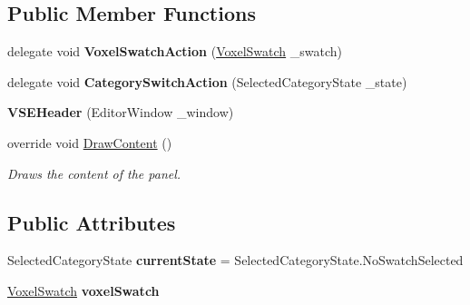\subsection*{Public Member Functions}
\begin{DoxyCompactItemize}
\item 
delegate void {\bfseries Voxel\+Swatch\+Action} (\hyperlink{class_voxel_swatch}{Voxel\+Swatch} \+\_\+swatch)\hypertarget{class_v_s_e_header_a7181bf17ebc70c90620ca9e4e7a679b5}{}\label{class_v_s_e_header_a7181bf17ebc70c90620ca9e4e7a679b5}

\item 
delegate void {\bfseries Category\+Switch\+Action} (Selected\+Category\+State \+\_\+state)\hypertarget{class_v_s_e_header_a701bc298aa2c2d6e552d33bfbd1cd495}{}\label{class_v_s_e_header_a701bc298aa2c2d6e552d33bfbd1cd495}

\item 
{\bfseries V\+S\+E\+Header} (Editor\+Window \+\_\+window)\hypertarget{class_v_s_e_header_ac43871f65cffd7378b7f92753f54d35d}{}\label{class_v_s_e_header_ac43871f65cffd7378b7f92753f54d35d}

\item 
override void \hyperlink{class_v_s_e_header_ac866415e77168e78f59965f3a61a0e64}{Draw\+Content} ()
\begin{DoxyCompactList}\small\item\em Draws the content of the panel. \end{DoxyCompactList}\end{DoxyCompactItemize}
\subsection*{Public Attributes}
\begin{DoxyCompactItemize}
\item 
Selected\+Category\+State {\bfseries current\+State} = Selected\+Category\+State.\+No\+Swatch\+Selected\hypertarget{class_v_s_e_header_ae6542a2ef5fba7ebd929bd8d0c9c7dac}{}\label{class_v_s_e_header_ae6542a2ef5fba7ebd929bd8d0c9c7dac}

\item 
\hyperlink{class_voxel_swatch}{Voxel\+Swatch} {\bfseries voxel\+Swatch}\hypertarget{class_v_s_e_header_a428ff88cfcafe14c61962451d4b0005b}{}\label{class_v_s_e_header_a428ff88cfcafe14c61962451d4b0005b}

\end{DoxyCompactItemize}
